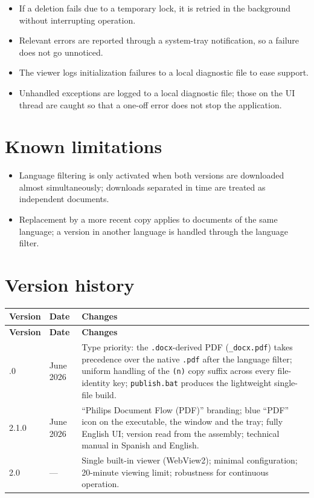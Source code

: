 \documentclass[11pt,a4paper]{article}
\begin{document}
\begin{itemize}[leftmargin=1.4em,itemsep=2pt]
  \item If a deletion fails due to a temporary lock, it is retried in the
        background without interrupting operation.
  \item Relevant errors are reported through a system-tray notification, so a
        failure does not go unnoticed.
  \item The viewer logs initialization failures to a local diagnostic file to ease
        support.
  \item Unhandled exceptions are logged to a local diagnostic file; those on the
        UI thread are caught so that a one-off error does not stop the
        application.
\end{itemize}

\section{Known limitations}
\begin{itemize}[leftmargin=1.4em,itemsep=3pt]
  \item Language filtering is only activated when both versions are downloaded
        almost simultaneously; downloads separated in time are treated as
        independent documents.
  \item Replacement by a more recent copy applies to documents of the same
        language; a version in another language is handled through the language
        filter.
\end{itemize}

\section{Version history}
\begin{xltabular}{\textwidth}{@{} p{1.8cm} p{2.6cm} L @{}}
\toprule
\textbf{Version} & \textbf{Date} & \textbf{Changes} \\
\midrule
\endfirsthead
\toprule
\textbf{Version} & \textbf{Date} & \textbf{Changes} \\
\midrule
\endhead
\bottomrule
{}.0 & June 2026 & Type priority: the \texttt{.docx}-derived PDF (\texttt{\_docx.pdf}) takes precedence over the native \texttt{.pdf} after the language filter; uniform handling of the \texttt{(n)} copy suffix across every file-identity key; \texttt{publish.bat} produces the lightweight single-file build. \\
2.1.0 & June 2026 & ``Philips Document Flow (PDF)'' branding; blue ``PDF'' icon on the executable, the window and the tray; fully English UI; version read from the assembly; technical manual in Spanish and English. \\
2.0 & --- & Single built-in viewer (WebView2); minimal configuration; 20-minute viewing limit; robustness for continuous operation. \\
\bottomrule
\end{xltabular}
\end{document}
